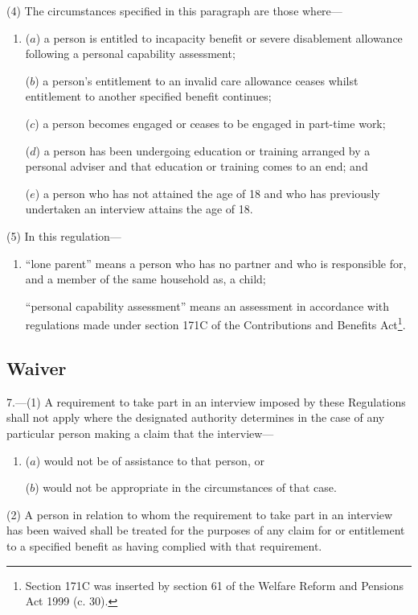 \documentclass[12pt,a4paper]{article}
\begin{document}
(4) The circumstances specified in this paragraph are those where—
\begin{enumerate}\item[]
($a$) a person is entitled to incapacity benefit or severe disablement allowance following a personal capability assessment;

($b$) a person’s entitlement to an invalid care allowance ceases whilst entitlement to another specified benefit continues;

($c$) a person becomes engaged or ceases to be engaged in part-time work;

($d$) a person has been undergoing education or training arranged by a personal adviser and that education or training comes to an end; and

($e$) a person who has not attained the age of 18 and who has previously undertaken an interview attains the age of 18.
\end{enumerate}

(5) In this regulation—
\begin{enumerate}\item[]
“lone parent” means a person who has no partner and who is responsible for, and a member of the same household as, a child;

“personal capability assessment” means an assessment in accordance with regulations made under section 171C of the Contributions and Benefits Act\footnote{\frenchspacing Section 171C was inserted by section 61 of the Welfare Reform and Pensions Act 1999 (c. 30).}.
\end{enumerate}

\subsection[7. Waiver]{Waiver}

7.---(1)  A requirement to take part in an interview imposed by these Regulations shall not apply where the designated authority determines in the case of any particular person making a claim that the interview—
\begin{enumerate}\item[]
($a$) would not be of assistance to that person, or

($b$) would not be appropriate in the circumstances of that case.
\end{enumerate}

(2) A person in relation to whom the requirement to take part in an interview has been waived shall be treated for the purposes of any claim for or entitlement to a specified benefit as having complied with that requirement.
\end{document}
